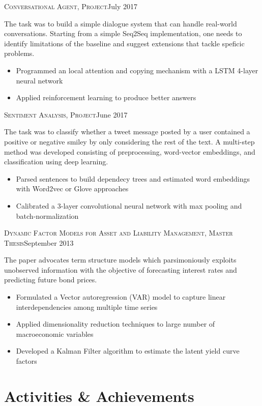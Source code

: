 \documentclass[11pt,a4paper,sans]{moderncv}
\begin{document}
\cventry{}
	{\vspace{-0.4cm}}
	{\textsc{Conversational Agent, Project}}{July 2017}{}
	{
	The task was to build a simple dialogue system that can handle real-world conversations. Starting from a simple Seq2Seq implementation, one needs to identify limitations of the baseline and suggest extensions that tackle speficic problems. 
	\vspace{1mm}
	\begin{itemize}
		\item Programmed an local attention and copying mechanism with a LSTM 4-layer neural network
		\item Applied reinforcement learning to produce better answers
		\vspace{2mm}	
	\end{itemize}
	}
\cventry{}
	{\vspace{-0.4cm}}
	{\textsc{Sentiment Analysis, Project}}{June 2017}{}
	{
	The task was to classify whether a tweet message posted by a user contained a positive or negative smiley by only considering the rest of the text. A multi-step method was developed consisting of preprocessing, word-vector embeddings, and classification using deep learning. 
	\vspace{1mm}
	\begin{itemize}
		\item Parsed sentences to build dependecy trees and estimated word embeddings with Word2vec or Glove approaches
		\item Calibrated a 3-layer convolutional neural network with max pooling and batch-normalization
		\vspace{2mm}	
	\end{itemize}
	}
\cventry{}
	{\vspace{-0.4cm}}
	{\textsc{Dynamic Factor Models for Asset and Liability Management, Master Thesis}}{September 2013}{}
	{
	The paper advocates term structure models which parsimoniously exploits  unobserved information with the objective of forecasting interest rates and predicting future bond prices.	
	\vspace{1mm}
	\begin{itemize}
		\item Formulated a Vector autoregression (VAR) model to capture linear interdependencies among multiple time series
		\item Applied dimensionality reduction techniques to large number of macroeconomic variables
		\item Developed a Kalman Filter algorithm to estimate the latent yield curve factors	
		\vspace{2mm}	
	\end{itemize}
	}

\section{\LARGE{Activities \& Achievements}}
\vspace{2mm}
\end{document}
